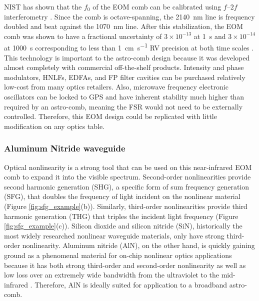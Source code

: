 \documentclass[11pt]{article}
\begin{document}
NIST has shown that the $f_0$ of the EOM comb can be calibrated using $f$--$2f$ interferometry \citep{Beha2017}. Since the comb is octave-spanning, the \SI{2140}{\nano\meter} line is frequency doubled and beat against the \SI{1070}{\nano\meter} line. After this stabilization, the EOM comb was shown to have a fractional uncertainty of $3 \times 10^{-13}$ at \SI{1}{\second} and $3 \times 10^{-14}$ at \SI{1000}{\second} corresponding to less than \SI{1}{\centi\meter\per\second} RV precision at both time scales \citep{Beha2017}. This technology is important to the astro-comb design because it was developed almost completely with commercial off-the-shelf products. Intensity and phase modulators, HNLFs, EDFAs, and FP filter cavities can be purchased relatively low-cost from many optics retailers. Also, microwave frequency electronic oscillators can be locked to GPS and have inherent stability much higher than required by an astro-comb, meaning the FSR would not need to be externally controlled. Therefore, this EOM design could be replicated with little modification on any optics table.

\subsubsection{Aluminum Nitride waveguide}

Optical nonlinearity is a strong tool that can be used on this near-infrared EOM comb to expand it into the visible spectrum. Second-order nonlinearities provide second harmonic generation (SHG), a specific form of sum frequency generation (SFG), that doubles the frequency of light incident on the nonlinear material (Figure \ref{fig:sfg_example}(b)). Similarly, third-order nonlinearities provide third harmonic generation (THG) that triples the incident light frequency (Figure \ref{fig:sfg_example}(c)). Silicon dioxide and silicon nitride (SiN), historically the most widely researched nonlinear waveguide materials, only have strong third-order nonlinearity. Aluminum nitride (AlN), on the other hand, is quickly gaining ground as a phenomenal material for on-chip nonlinear optics applications because it has both strong third-order and second-order nonlinearity as well as low loss over an extremely wide bandwidth from the ultraviolet to the mid-infrared \citep{Jung2016}. Therefore, AlN is ideally suited for application to a broadband astro-comb.
\end{document}
